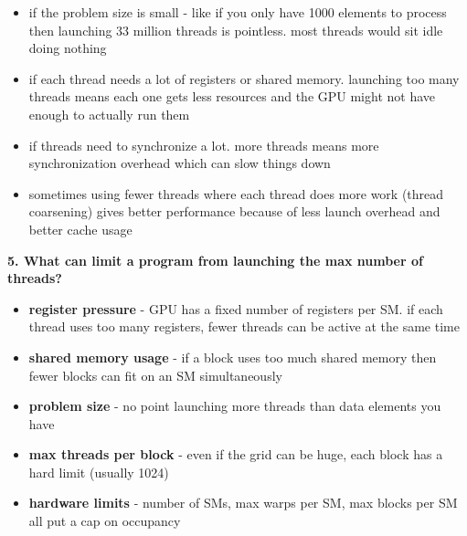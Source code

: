 \documentclass[12pt]{article}
\begin{document}
\begin{itemize}
\item if the problem size is small - like if you only have 1000 elements to process then launching 33 million threads is pointless. most threads would sit idle doing nothing

\item if each thread needs a lot of registers or shared memory. launching too many threads means each one gets less resources and the GPU might not have enough to actually run them

\item if threads need to synchronize a lot. more threads means more synchronization overhead which can slow things down

\item sometimes using fewer threads where each thread does more work (thread coarsening) gives better performance because of less launch overhead and better cache usage
\end{itemize}

\vspace{0.5cm}

\textbf{5. What can limit a program from launching the max number of threads?}

\vspace{0.3cm}

\begin{itemize}
\item \textbf{register pressure} - GPU has a fixed number of registers per SM. if each thread uses too many registers, fewer threads can be active at the same time

\item \textbf{shared memory usage} - if a block uses too much shared memory then fewer blocks can fit on an SM simultaneously

\item \textbf{problem size} - no point launching more threads than data elements you have

\item \textbf{max threads per block} - even if the grid can be huge, each block has a hard limit (usually 1024)

\item \textbf{hardware limits} - number of SMs, max warps per SM, max blocks per SM all put a cap on occupancy
\end{itemize}

\vspace{0.5cm}
\end{document}
